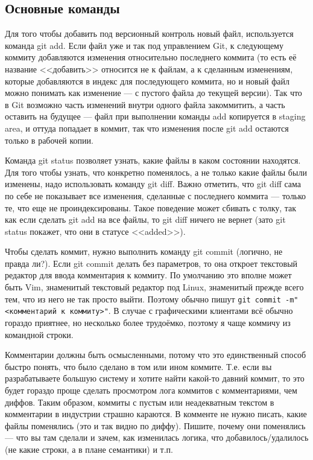 \documentclass{../text-style}
\begin{document}
\subsection{Основные команды}

Для того чтобы добавить под версионный контроль новый файл, используется команда git add. Если файл уже и так под управлением Git, к следующему коммиту добавляются изменения относительно последнего коммита (то есть её название <<добавить>> относится не к файлам, а к сделанным изменениям, которые добавляются в индекс для последующего коммита, но и новый файл можно понимать как изменение --- с пустого файла до текущей версии). Так что в Git возможно часть изменений внутри одного файла закоммитить, а часть оставить на будущее --- файл при выполнении команды add копируется в staging area, и оттуда попадает в коммит, так что изменения после git add остаются только в рабочей копии.

Команда git status позволяет узнать, какие файлы в каком состоянии находятся. Для того чтобы узнать, что конкретно поменялось, а не только какие файлы были изменены, надо использовать команду git diff. Важно отметить, что git diff сама по себе не показывает все изменения, сделанные с последнего коммита --- только те, что еще не проиндексированы. Такое поведение может сбивать с толку, так как если сделать git add на все файлы, то git diff ничего не вернет (зато git status покажет, что они в статусе <<added>>).

Чтобы сделать коммит, нужно выполнить команду git commit (логично, не правда ли?). Если git commit делать без параметров, то она откроет текстовый редактор для ввода комментария к коммиту. По умолчанию это вполне может быть Vim, знаменитый текстовый редактор под Linux, знаменитый прежде всего тем, что из него не так просто выйти. Поэтому обычно пишут \verb|git commit -m"<комментарий к коммиту>"|. В случае с графическими клиентами всё обычно гораздо приятнее, но несколько более трудоёмко, поэтому я чаще коммичу из командной строки.

Комментарии должны быть осмысленными, потому что это единственный способ быстро понять, что было сделано в том или ином коммите. Т.е. если вы разрабатываете большую систему и хотите найти какой-то давний коммит, то это будет гораздо проще сделать просмотром лога коммитов с комментариями, чем диффов. Таким образом, коммиты с пустым или неадекватным текстом в комментарии в индустрии страшно караются. В комменте не нужно писать, какие файлы поменялись (это и так видно по диффу). Пишите, почему они поменялись --- что вы там сделали и зачем, как изменилась логика, что добавилось/удалилось (не какие строки, а в плане семантики) и т.п.
\end{document}
